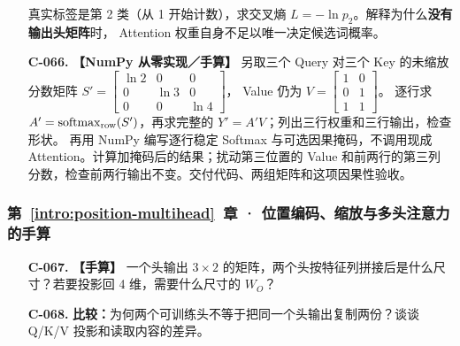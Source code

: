 \begin{enumerate}[label={},leftmargin=4.8em,itemsep=4pt]
真实标签是第 2 类（从 1 开始计数），求交叉熵
$L=-\ln p_2$。解释为什么\textbf{没有输出头矩阵}时，
Attention 权重自身不足以唯一决定候选词概率。
\item[\textbf{C-066.}] \leavevmode{}\label{exercise:C-066}\label{exercise:batch-softmax-recompute}\label{exercise:batch-attention-new} \textbf{【NumPy 从零实现／手算】}
另取三个 Query 对三个 Key 的未缩放分数矩阵
$S'=\begin{bmatrix}\ln2&0&0\\0&\ln3&0\\0&0&\ln4\end{bmatrix}$，
Value 仍为
$V=\begin{bmatrix}1&0\\0&1\\1&1\end{bmatrix}$。
逐行求 $A'=\operatorname{softmax}_{\rm row}(S')$，再求完整的
$Y'=A'V$；列出三行权重和三行输出，检查形状。 再用 NumPy 编写逐行稳定 Softmax 与可选因果掩码，不调用现成 Attention。计算加掩码后的结果；扰动第三位置的 Value 和前两行的第三列分数，检查前两行输出不变。交付代码、两组矩阵和这项因果性验收。
\end{enumerate}
\subsubsection*{第~\ref*{intro:position-multihead}~章 · 位置编码、缩放与多头注意力的手算}
\begin{enumerate}[label={},leftmargin=4.8em,itemsep=4pt]
\item[\textbf{C-067.}] \leavevmode{}\label{exercise:C-067}\label{exercise:head-concatenation}\textbf{【手算】} 一个头输出 $3\times2$ 的矩阵，两个头按特征列拼接后是什么尺寸？若要投影回 4 维，需要什么尺寸的 $W_O$？
\item[\textbf{C-068.}] \leavevmode{}\label{exercise:C-068}\label{exercise:head-projection-diversity}\textbf{比较：}为何两个可训练头不等于把同一个头输出复制两份？谈谈 Q/K/V 投影和读取内容的差异。
\end{enumerate}
